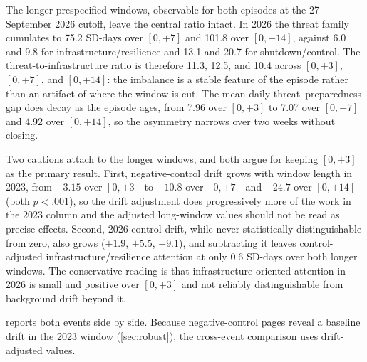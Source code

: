 \elsevierclasstrue\documentclass[preprint,12pt]{elsarticle}%
\begin{document}
The longer prespecified windows, observable for both episodes at the 27 September 2026 cutoff, leave the central ratio intact. In 2026 the threat family cumulates to 75.2 SD-days over $[0,+7]$ and 101.8 over $[0,+14]$, against 6.0 and 9.8 for infrastructure/resilience and 13.1 and 20.7 for shutdown/control. The threat-to-infrastructure ratio is therefore 11.3, 12.5, and 10.4 across $[0,+3]$, $[0,+7]$, and $[0,+14]$: the imbalance is a stable feature of the episode rather than an artifact of where the window is cut. The mean daily threat--preparedness gap does decay as the episode ages, from 7.96 over $[0,+3]$ to 7.07 over $[0,+7]$ and 4.92 over $[0,+14]$, so the asymmetry narrows over two weeks without closing.

Two cautions attach to the longer windows, and both argue for keeping $[0,+3]$ as the primary result. First, negative-control drift grows with window length in 2023, from $-3.15$ over $[0,+3]$ to $-10.8$ over $[0,+7]$ and $-24.7$ over $[0,+14]$ (both $p<.001$), so the drift adjustment does progressively more of the work in the 2023 column and the adjusted long-window values should not be read as precise effects. Second, 2026 control drift, while never statistically distinguishable from zero, also grows ($+1.9$, $+5.5$, $+9.1$), and subtracting it leaves control-adjusted infrastructure/resilience attention at only 0.6 SD-days over both longer windows. The conservative reading is that infrastructure-oriented attention in 2026 is small and positive over $[0,+3]$ and not reliably distinguishable from background drift beyond it.

 reports both events side by side. Because negative-control pages reveal a baseline drift in the 2023 window (\cref{sec:robust}), the cross-event comparison uses drift-adjusted values.
\end{document}
